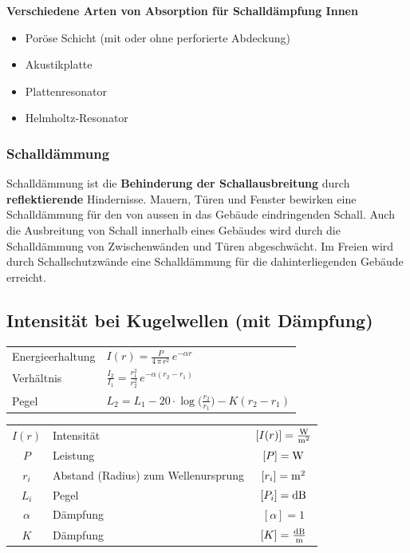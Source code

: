 \textbf{Verschiedene Arten von Absorption für Schalldämpfung Innen} \\

\begin{itemize}
	\item Poröse Schicht (mit oder ohne perforierte Abdeckung) 
	\item Akustikplatte 
	\item Plattenresonator
	\item Helmholtz-Resonator
\end{itemize}


\subsubsection{Schalldämmung} 

Schalldämmung ist die \textbf{Behinderung der Schallausbreitung} durch
\textbf{reflektierende} Hindernisse. Mauern, Türen und Fenster bewirken eine
Schalldämmung für den von aussen in das Gebäude eindringenden
Schall. Auch die Ausbreitung von Schall innerhalb eines Gebäudes wird
durch die Schalldämmung von Zwischenwänden und Türen
abgeschwächt. Im Freien wird durch Schallschutzwände eine
Schalldämmung für die dahinterliegenden Gebäude erreicht.




\subsection{Intensität bei Kugelwellen (mit Dämpfung)}

\renewcommand{\arraystretch}{2.7}
\begin{tabular}{ll}
Energieerhaltung & $ \boxed{ I(r) = \frac{P}{4 \, \pi \, r^2} \, e^{- \alpha r}}$ \\

Verhältnis & $\boxed{ \frac{I_2}{I_1} = \frac{r_1^2}{r_2^2} \, e^{- \alpha (r_2 - r_1)} }$ \\

Pegel & $\boxed{ L_2 = L_1 - 20 \cdot \log \Big( \frac{r_2}{r_1} \Big) - K (r_2 - r_1)  }$ \\
\end{tabular}
\renewcommand{\arraystretch}{1}

\vspace{0.2cm}


\renewcommand{\arraystretch}{1.3}
\begin{tabular}{clc}
$I(r)$ & Intensität & $[I(r)] = \frac{\mathrm{W}}{\mathrm{m}^2}$ \\
$P$ & Leistung & $[P] = \mathrm{W}$ \\
$r_i$ & Abstand (Radius) zum Wellenursprung & $[r_i] = \mathrm{m}^2$\\
$L_i$ & Pegel & $[P_i] = \mathrm{dB}$ \\
$\alpha$ & Dämpfung & $[\alpha] = 1$ \\
$K$ & Dämpfung & $[K] = \frac{\mathrm{dB}}{\mathrm{m}}$
\end{tabular}
\renewcommand{\arraystretch}{1}



